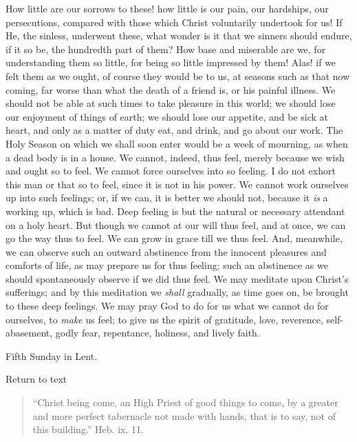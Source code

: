 How little are our sorrows to these! how little is our pain, our
hardships, our persecutions, compared with those which Christ
voluntarily undertook for us! If He, the sinless, underwent these, what
wonder is it that we sinners should endure, if it so be, the hundredth
part of them? How base and miserable are we, for understanding them so
little, for being so little impressed by them! Alas! if we felt them as
we ought, of course they would be to us, at seasons such as that now
coming, far worse than what the death of a friend is, or his painful
illness. We should not be able at such times to take pleasure in this
world; we should lose our enjoyment of things of earth; we should lose
our appetite, and be sick at heart, and only as a matter of duty eat,
and drink, and go about our work. The Holy Season on which we shall soon
enter would be a week of mourning, as when a dead body is in a house. We
cannot, indeed, thus feel, merely because we wish and ought so to feel.
We cannot force ourselves into so feeling. I do not exhort this man or
that so to feel, since it is not in his power. We cannot work ourselves
up into such feelings; or, if we can, it is better we should not, because it \emph{is} a working up, which is bad. Deep feeling is but the
natural or necessary attendant on a holy heart. But though we cannot at
our will thus feel, and at once, we can go the way thus to feel. We can
grow in grace till we thus feel. And, meanwhile, we can observe such an
outward abstinence from the innocent pleasures and comforts of life, as
may prepare us for thus feeling; such an abstinence as we should
spontaneously observe if we did thus feel. We may meditate upon Christ's
sufferings; and by this meditation we \emph{shall} gradually, as time
goes on, be brought to these deep feelings. We may pray God to do for us
what we cannot do for ourselves, to \emph{make} us feel; to give us the
spirit of gratitude, love, reverence, self-abasement, godly fear,
repentance, holiness, and lively faith.


Fifth Sunday in Lent.

Return to text


\begin{quote}

``Christ being come, an High Priest of good things to come, by
a greater and more perfect tabernacle not made with hands, that is to
say, not of this building.'' Heb. ix. 11.

\end{quote}

